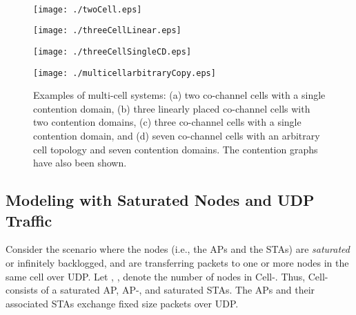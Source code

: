 \documentclass[10pt,a4paper,journal]{IEEEtran}
\theoremstyle{definition}
\theoremstyle{remark}
\theoremstyle{plain}
\begin{document}
\begin{figure}[tb]
  \centering \
  \begin{minipage}{1.5cm}
    \begin{center}
      \texttt{[image: ./twoCell.eps]}
      \subfigure[]{\label{fig:twoCell}}
    \end{center}
  \end{minipage}
\hspace{1cm}
  \begin{minipage}{2.5cm}
    \begin{center}
      \texttt{[image: ./threeCellLinear.eps]}
      \subfigure[]{\label{fig:threeCellLinear}}
    \end{center}
  \end{minipage}
\hspace{2cm}
  \begin{minipage}{2.75cm}
    \begin{center}
      \texttt{[image: ./threeCellSingleCD.eps]}
      \subfigure[]{\label{fig:threeCellSingleCD}}
    \end{center}
  \end{minipage}
\hspace{1.5cm}
  \begin{minipage}{2.75cm}
    \begin{center}
      \texttt{[image: ./multicellarbitraryCopy.eps]}
      \subfigure[]{\label{fig:sevenCellArbitrary}}
    \end{center}
  \end{minipage}
  \hfill
  \caption{Examples of multi-cell systems: (a) two co-channel cells
    with a single contention domain, (b) three linearly placed
    co-channel cells with two contention domains, (c) three co-channel
    cells with a single contention domain, and (d) seven co-channel
    cells with an arbitrary cell topology and seven contention
    domains. The contention graphs have also been shown.}
\end{figure}



\subsection{Modeling with Saturated Nodes and UDP Traffic}
\label{subsec:saturated-case}

Consider the scenario where the nodes (i.e., the APs and the STAs) are \textit{saturated} or infinitely backlogged, and are transferring packets to one or more nodes in the same cell over UDP. Let , , denote the number of nodes in Cell-. Thus, Cell- consists of a saturated AP, AP-, and  saturated STAs. The APs and their associated STAs exchange fixed size packets over UDP.
\end{document}

